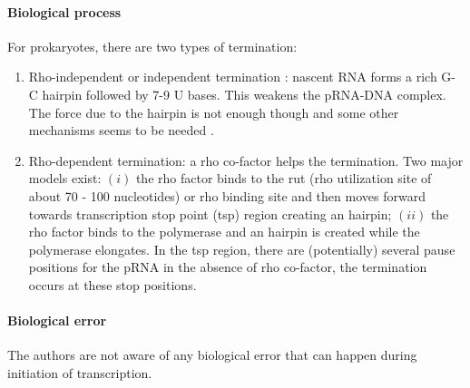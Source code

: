 \paragraph{Biological process} For prokaryotes, there are two types of termination:
\begin{enumerate}
  \item Rho-independent or independent termination \citep{GuN:99,WaG:10}: nascent RNA forms a rich G-C hairpin followed by 7-9 U bases. This weakens the pRNA-DNA complex. The force due to the hairpin is not enough though and some other mechanisms seems to be needed \citep{HeB:08}.
  \item Rho-dependent termination: a rho co-factor helps the termination. Two major models exist: $(i)$ the rho factor binds to the rut (rho utilization site of about 70 - 100 nucleotides) or rho binding site and then moves forward towards transcription stop point (tsp) region creating an hairpin; $(ii)$ the rho factor binds to the polymerase \citep{EDWN:10} and an hairpin is created while the polymerase elongates. In the tsp region, there are (potentially) several pause positions for the pRNA in the absence of rho co-factor, the termination occurs at these stop positions.
\end{enumerate}


\paragraph{Biological error} The authors are not aware of any biological error that can happen during initiation of transcription.


